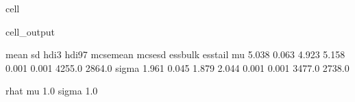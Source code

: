 \documentclass[letterpaper,10pt,english]{jupyterBook}
\begin{document}
\begin{sphinxuseclass}{cell}
\begin{sphinxVerbatimOutput}
\begin{sphinxuseclass}{cell_output}
\begin{sphinxVerbatim}[commandchars=\\\{\}]
        mean     sd  hdi\PYGZus{}3\PYGZpc{}  hdi\PYGZus{}97\PYGZpc{}  mcse\PYGZus{}mean  mcse\PYGZus{}sd  ess\PYGZus{}bulk  ess\PYGZus{}tail  \PYGZbs{}
mu     5.038  0.063   4.923    5.158      0.001    0.001    4255.0    2864.0   
sigma  1.961  0.045   1.879    2.044      0.001    0.001    3477.0    2738.0   

       r\PYGZus{}hat  
mu       1.0  
sigma    1.0  
\end{sphinxVerbatim}

\end{sphinxuseclass}\end{sphinxVerbatimOutput}

\end{sphinxuseclass}
\sphinxAtStartPar
{}
\end{document}
